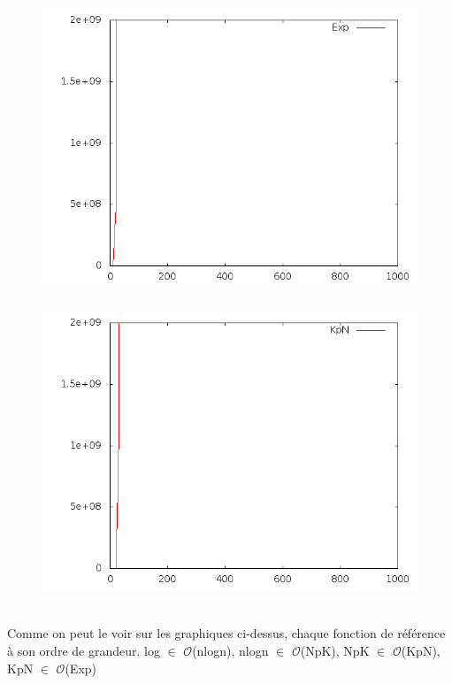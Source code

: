 \documentclass[a4paper,12pt]{report}
\begin{document}
\begin{figure}[!ht]
{     	\hspace*{1cm}
		\includegraphics[scale=0.3]{q164.png}
	}
	\hbox{ 
     	\hspace*{5cm}
		\includegraphics[scale=0.3]{q165.png}
	}
\end{figure}

Comme on peut le voir sur les graphiques ci-dessus, chaque fonction de référence à son ordre de grandeur.
log $\in$ $\mathcal{O}$(nlogn), nlogn $\in$ $\mathcal{O}$(NpK), NpK $\in$ $\mathcal{O}$(KpN), KpN $\in$ $\mathcal{O}$(Exp)

\newpage
\end{document}
